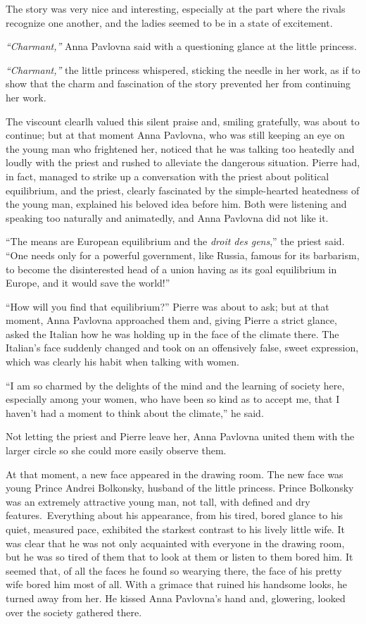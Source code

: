 The story was very nice and interesting, especially at the part where
the rivals recognize one another, and the ladies seemed to be in a
state of excitement.

\textit{``Charmant,''} Anna Pavlovna said with a questioning glance at
the little princess.

\textit{``Charmant,''} the little princess whispered, sticking the
needle in her work, as if to show that the charm and fascination of
the story prevented her from continuing her work.

The viscount clearlh valued this silent praise and, smiling
gratefully, was about to continue; but at that moment Anna Pavlovna,
who was still keeping an eye on the young man who frightened her,
noticed that he was talking too heatedly and loudly with the priest and
rushed to alleviate the dangerous situation. Pierre had, in fact,
managed to strike up a conversation with the priest about political
equilibrium, and the priest, clearly fascinated by the simple-hearted
heatedness of the young man, explained his beloved idea before
him. Both were listening and speaking too naturally and animatedly,
and Anna Pavlovna did not like it.

``The means are European equilibrium and the \textit{droit des
  gens},'' the priest said. ``One needs only for a powerful government,
like Russia, famous for its barbarism, to become the disinterested
head of a union having as its goal equilibrium in Europe, and it would
save the world!''

``How will you find that equilibrium?'' Pierre was about to ask; but
at that moment, Anna Pavlovna approached them and, giving Pierre a
strict glance, asked the Italian how he was holding up in the face of
the climate there. The Italian's face suddenly changed and took on an
offensively false, sweet expression, which was clearly his habit when
talking with women.

``I am so charmed by the delights of the mind and the learning of
society here, especially among your women, who have been so kind as to
accept me, that I haven't had a moment to think about the climate,''
he said.

Not letting the priest and Pierre leave her, Anna Pavlovna united them
with the larger circle so she could more easily observe them.

At that moment, a new face appeared in the drawing room. The new face
was young Prince Andrei Bolkonsky, husband of the little
princess. Prince Bolkonsky was an extremely attractive young man, not
tall, with defined and dry features.\ Everything about his
appearance, from his tired, bored glance to his quiet, measured pace,
exhibited the starkest contrast to his lively little wife. It was
clear that he was not only acquainted with everyone in the drawing
room, but he was so tired of them that to look at them or listen to
them bored him. It seemed that, of all the faces he found so wearying
there, the face of his pretty wife bored him most of all. With a
grimace that ruined his handsome looks, he turned away from her. He
kissed Anna Pavlovna's hand and, glowering, looked over the society
gathered there.


